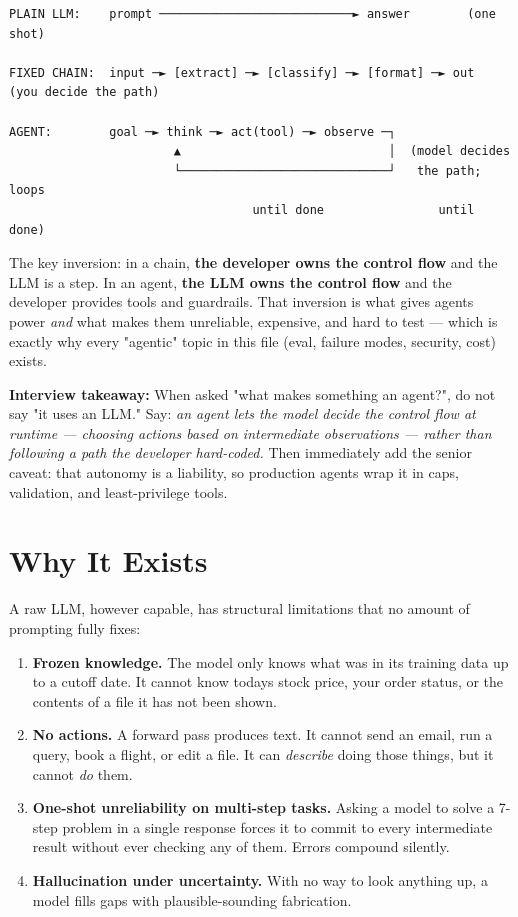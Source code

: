 \documentclass[11pt]{article}
\providecommand{\tightlist}{\setlength{\itemsep}{1pt}\setlength{\parskip}{0pt}}
\begin{document}
\setcodelang{}

\begin{verbatim}
PLAIN LLM:    prompt ───────────────────────────► answer        (one shot)

FIXED CHAIN:  input ─► [extract] ─► [classify] ─► [format] ─► out  (you decide the path)

AGENT:        goal ─► think ─► act(tool) ─► observe ─┐
                       ▲                             │  (model decides
                       └─────────────────────────────┘   the path; loops
                                  until done                until done)
\end{verbatim}

The key inversion: in a chain, \textbf{the developer owns the control flow} and the LLM is a step. In an agent, \textbf{the LLM owns the control flow} and the developer provides tools and guardrails. That inversion is what gives agents power \emph{and} what makes them unreliable, expensive, and hard to test --- which is exactly why every "agentic" topic in this file (eval, failure modes, security, cost) exists.

\textbf{Interview takeaway:} When asked "what makes something an agent?", do not say "it uses an LLM." Say: \emph{an agent lets the model decide the control flow at runtime --- choosing actions based on intermediate observations --- rather than following a path the developer hard-coded.} Then immediately add the senior caveat: that autonomy is a liability, so production agents wrap it in caps, validation, and least-privilege tools.

\section{Why It Exists}\label{why-it-exists}

A raw LLM, however capable, has structural limitations that no amount of prompting fully fixes:

\begin{enumerate}
\def\labelenumi{\arabic{enumi}.}
\tightlist
\item
  \textbf{Frozen knowledge.} The model only knows what was in its training data up to a cutoff date. It cannot know today\textquotesingle s stock price, your order status, or the contents of a file it has not been shown.
\item
  \textbf{No actions.} A forward pass produces text. It cannot send an email, run a query, book a flight, or edit a file. It can \emph{describe} doing those things, but it cannot \emph{do} them.
\item
  \textbf{One-shot unreliability on multi-step tasks.} Asking a model to solve a 7-step problem in a single response forces it to commit to every intermediate result without ever checking any of them. Errors compound silently.
\item
  \textbf{Hallucination under uncertainty.} With no way to look anything up, a model fills gaps with plausible-sounding fabrication.
\end{enumerate}
\end{document}
